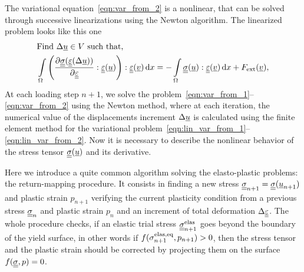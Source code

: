 \documentclass[12pt]{article}
\newcommand{\todounderline}[1]{\todo[inline, size=\scriptsize]{#1}}
\begin{document}
The variational equation~\eqref{eqn:var_from_2} is a nonlinear, that can be solved through successive linearizations using the
Newton algorithm. The linearized problem looks like this one
\begin{align}
    & \text{Find } \Delta\underline{u} \in V \text{ such that,} \label{eqn:lin_var_from_1} \\ 
    & \int\limits_\Omega \left(\frac{\partial\underline{\underline{\sigma}}(\underline{\underline{\varepsilon}}(\Delta\underline{u}))}{\partial\underline{\underline{\varepsilon}}} : \underline{\underline{\varepsilon}}(\underline{u})\right) : \underline{\underline{\varepsilon}}(\underline{v}) \, \mathrm{d} x = -\int\limits_\Omega\underline{\underline{\sigma}}(\underline{u}) : \underline{\underline{\varepsilon}}(\underline{v}) \, \mathrm{d} x + F_\text{ext}(\underline{v}) \label{eqn:lin_var_from_2},
\end{align}
At each loading step $n+1$, we solve the problem~\eqref{eqn:var_from_1}--\eqref{eqn:var_from_2} using the Newton method, where at each iteration, the numerical value of the displacements increment $\Delta\underline{u}$ is calculated using the finite element method for the variational problem~\eqref{eqn:lin_var_from_1}--\eqref{eqn:lin_var_from_2}. Now it is necessary to describe the nonlinear behavior of the stress tensor $\underline{\underline{\sigma}}(\underline{u})$ and its derivative.

Here we introduce a quite common algorithm solving the elasto-plastic problems: the return-mapping procedure. It consists in finding a new stress $\underline{\underline{\sigma}}_{n+1} = \underline{\underline{\sigma}}(\underline{u}_{n+1})$ and plastic strain $p_{n+1}$ verifying the current plasticity condition from a previous stress $\underline{\underline{\sigma}}_{n}$ and plastic strain $p_n$ and an increment of total deformation $\Delta\underline{\underline{\varepsilon}}$. The whole procedure checks, if an elastic trial stress $\underline{\underline{\sigma}}_{n+1}^{\text{elas}}$ goes beyond the boundary of the yield surface, in other words if $f(\sigma_{n+1}^\text{elas,eq}, p_{n+1}) > 0$, then the stress tensor and the plastic strain should be corrected by projecting them on the surface $f(\underline{\underline{\sigma}}, p) = 0$. 
\end{document}
